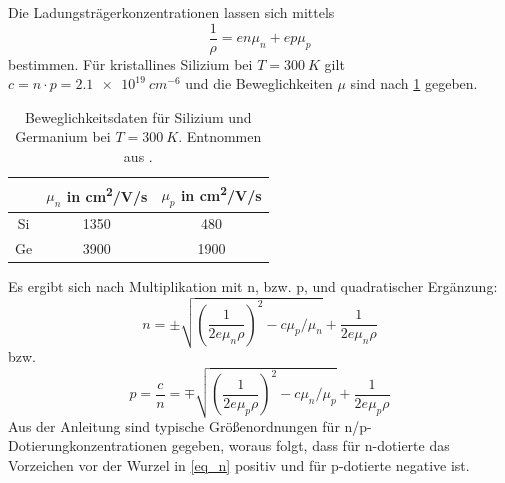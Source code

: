 \documentclass[
	a4paper,
	12pt,
	pagesize,
	ngerman
]{scrartcl}
\begin{document}
	Die Ladungsträgerkonzentrationen lassen sich mittels
	\begin{equation}
			\frac{1}{\rho}=en\mu_n + ep\mu_p
	\end{equation}
	bestimmen.
	Für kristallines Silizium bei $T=\SI{300}{K}$ gilt $c=n\cdot p=\SI{2.1e19}{cm^{-6}}$ und die Beweglichkeiten $\mu$ sind nach \cref{tb_beweg} gegeben.


	\begin{table}[H]
		\centering
		\begin{tabular}{c | c | c  }
			 &$\mu_n$ in \si{cm^2/V/s}&$\mu_p$ in \si{cm^2/V/s}\\ \hline
			 Si&1350&480 \\
			 Ge&3900&1900 \\
		\end{tabular}
		\caption{
		Beweglichkeitsdaten für Silizium und Germanium bei $T=\SI{300}{K}$. Entnommen aus \cite{anleitung}.
		}
		\label{tb_beweg}
	\end{table}

	Es ergibt sich nach Multiplikation mit n, bzw. p, und quadratischer Ergänzung:
	\begin{equation}
		\label{eq_n}
			n =  \pm\sqrt{\left(\frac{1}{2e\mu_n\rho}\right)^2-c\mu_p/\mu_n}+\frac{1}{2e\mu_n \rho}
	\end{equation}
	bzw.
	\begin{equation}
			\label{eq_p}
			p =\frac{c}{n}=  \mp\sqrt{\left(\frac{1}{2e\mu_p\rho}\right)^2-c\mu_n/\mu_p}+\frac{1}{2e\mu_p \rho}
	\end{equation}
	Aus der Anleitung sind typische Größenordnungen für n/p-Dotierungkonzentrationen gegeben, woraus folgt, dass für n-dotierte das Vorzeichen vor der Wurzel in \cref{eq_n} positiv und für p-dotierte negative ist.
\end{document}
